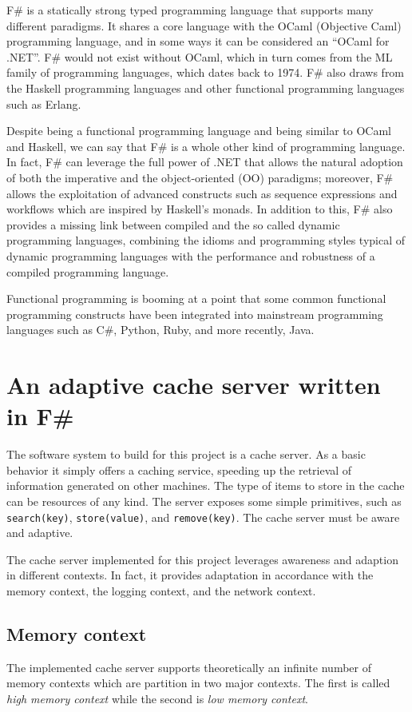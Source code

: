 \documentclass[11pt,a4paper]{article}
\begin{document}
F\# is a statically strong typed programming language that supports many different paradigms. It shares a core language with the OCaml (Objective Caml) programming language, and in some ways it can be considered an ``OCaml for .NET''. F\# would not exist without OCaml, which in turn comes from the ML family of programming languages, which dates back to 1974. F\# also draws from the Haskell programming languages and other functional programming languages such as Erlang.

Despite being a functional programming language and being similar to OCaml and Haskell, we can say that F\# is a whole other kind of programming language. In fact, F\# can leverage the full power of .NET that allows the natural adoption of both the imperative and the object-oriented (OO) paradigms; moreover, F\# allows the exploitation of advanced constructs such as sequence expressions and workflows which are inspired by Haskell's monads. In addition to this, F\# also provides a missing link between compiled and the so called dynamic programming languages, combining the idioms and programming styles typical of dynamic programming languages with the performance and robustness of a compiled programming language.

Functional programming is booming at a point that some common functional programming constructs have been integrated into mainstream programming languages such as C\#, Python, Ruby, and more recently, Java.

\section{An adaptive cache server written in F\#}
\label{section:work}
The software system to build for this project is a cache server. As a basic behavior it simply offers a caching service, speeding up the retrieval of information generated on other machines. The type of items to store in the cache can be resources of any kind. The server exposes some simple primitives, such as \texttt{search(key)}, \texttt{store(value)}, and \texttt{remove(key)}. The cache server must be aware and adaptive.

The cache server implemented for this project leverages awareness and adaption in different contexts. In fact, it provides adaptation in accordance with the memory context, the logging context, and the network context.

\subsection{Memory context}
\label{section:work:memory-context}
The implemented cache server supports theoretically an infinite number of memory contexts which are partition in two major contexts. The first is called \textit{high memory context} while the second is \textit{low memory context}.
\end{document}
